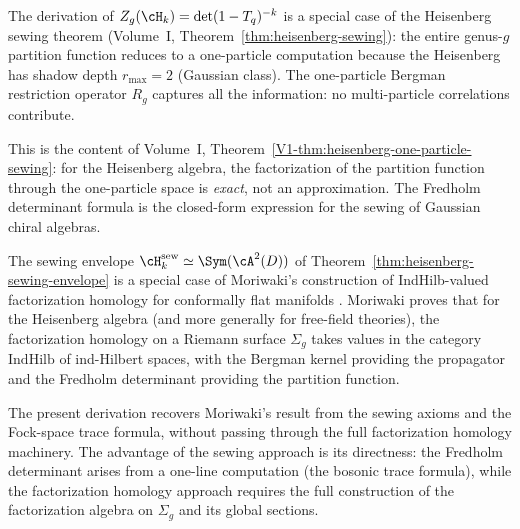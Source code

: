 \begin{remark}
The derivation of $Z_g(\cH_k) = \det(1-T_q)^{-k}$ is a special
case of the Heisenberg sewing theorem
(Volume~I, Theorem~\ref*{thm:heisenberg-sewing}): the entire
genus-$g$ partition function reduces to a one-particle computation
because the Heisenberg has shadow depth $r_{\max} = 2$ (Gaussian
class). The one-particle Bergman restriction operator $R_g$ captures
all the information: no multi-particle correlations contribute.

This is the content of Volume~I,
Theorem~\ref*{V1-thm:heisenberg-one-particle-sewing}: for the
Heisenberg algebra, the factorization of the partition function
through the one-particle space is \emph{exact}, not an
approximation. The Fredholm determinant formula is the closed-form
expression for the sewing of Gaussian chiral algebras.
\end{remark}

\begin{remark}
The sewing envelope $\cH_k^{\mathrm{sew}} \simeq \Sym(\cA^2(D))$
of Theorem~\ref{thm:heisenberg-sewing-envelope} is a special case
of Moriwaki's construction of IndHilb-valued factorization homology
for conformally flat manifolds \cite{Mor26}. Moriwaki proves that
for the Heisenberg algebra (and more generally for free-field
theories), the factorization homology on a Riemann surface $\Sigma_g$
takes values in the category $\mathrm{IndHilb}$ of ind-Hilbert
spaces, with the Bergman kernel providing the propagator and the
Fredholm determinant providing the partition function.

The present derivation recovers Moriwaki's result from the sewing
axioms and the Fock-space trace formula, without passing through
the full factorization homology machinery. The advantage of the
sewing approach is its directness: the Fredholm determinant arises
from a one-line computation (the bosonic trace formula), while the
factorization homology approach requires the full construction of
the factorization algebra on $\Sigma_g$ and its global sections.
\end{remark}

